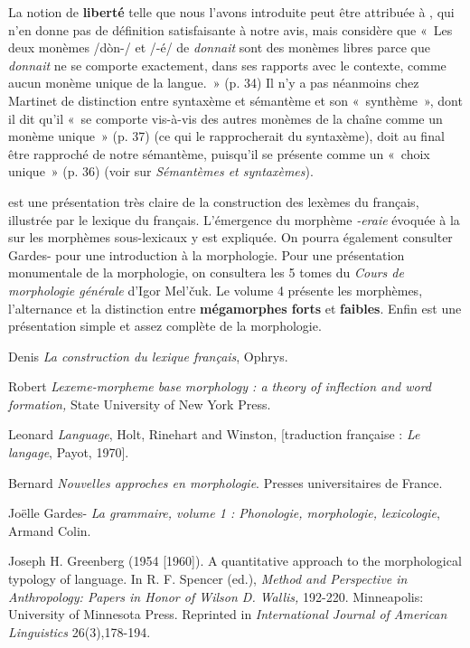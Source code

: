 {    La notion de \textbf{liberté} telle que nous l’avons introduite peut être attribuée à \citet{Martinet1985}, qui n’en donne pas de définition satisfaisante à notre avis, mais considère que «~Les deux monèmes /dòn-/ et /-é/ de \textit{donnait} sont des monèmes libres parce que \textit{donnait} ne se comporte exactement, dans ses rapports avec le contexte, comme aucun monème unique de la langue.~» (p. 34) Il n’y a pas néanmoins chez Martinet de distinction entre syntaxème et sémantème et son «~synthème~», dont il dit qu’il «~se comporte vis-à-vis des autres monèmes de la chaîne comme un monème unique~» (p. 37) (ce qui le rapprocherait du syntaxème), doit au final être rapproché de notre sémantème, puisqu’il se présente comme un «~choix unique~» (p. 36) (voir  sur \textit{Sémantèmes et syntaxèmes}).

    \citet{Apothéloz2002} est une présentation très claire de la construction des lexèmes du français, illustrée par le lexique du français. L’émergence du morphème \textit{{}-eraie} évoquée à la  sur les morphèmes sous-lexicaux y est expliquée. On pourra également consulter Gardes-\citet{Tamine1990} pour une introduction à la morphologie. Pour une présentation monumentale de la morphologie, on consultera les 5 tomes du \textit{Cours de morphologie générale} d’Igor Mel’čuk. Le volume 4 présente les morphèmes, l’alternance et la distinction entre \textbf{mégamorphes forts} et \textbf{faibles}. Enfin \citet{HaspelmathSims2013} est une présentation simple et assez complète de la morphologie.

    Denis \citet{Apothéloz2002} \textit{La construction du lexique français}, Ophrys.

    Robert \citet{Beard1995} \textit{Lexeme-morpheme base morphology : a theory of inflection and word formation,} State University of New York Press.

    Leonard \citet{Bloomfield1933} \textit{Language}, Holt, Rinehart and Winston, [traduction française : \textit{Le langage}, Payot, 1970].

    Bernard \citet{Fradin2003} \textit{Nouvelles approches en morphologie}. Presses universitaires de France.

    Joëlle Gardes-\citet{Tamine1990} \textit{La grammaire, volume 1 : Phonologie, morphologie, lexicologie}, Armand Colin.

    Joseph H. Greenberg (1954 [1960]). A quantitative approach to the morphological typology of language. In R. F. Spencer (ed.), \textit{Method and Perspective in Anthropology: Papers in Honor of Wilson D. Wallis,} 192-220. Minneapolis: University of Minnesota Press. Reprinted in \textit{International Journal of American Linguistics} 26(3),178-194.

}
